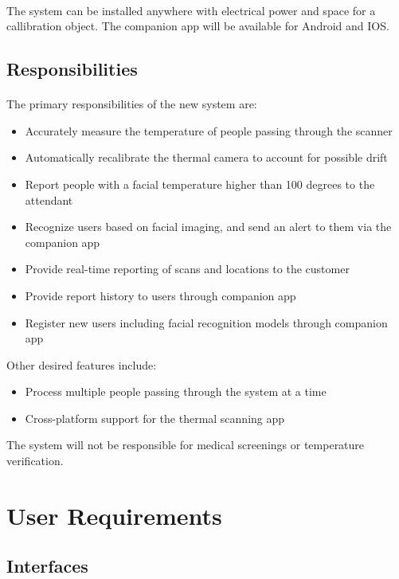 \documentclass[12pt, letterpaper]{article}
\begin{document}
    \paragraph{}
    The system can be installed anywhere with electrical power and space for a callibration object. The companion app
    will be available for Android and IOS.
    \subsection{Responsibilities}
    \paragraph{}
    The primary responsibilities of the new system are:
    \begin{itemize}
        \item Accurately measure the temperature of people passing through the scanner
        \item Automatically recalibrate the thermal camera to account for possible drift
        \item Report people with a facial temperature higher than 100 degrees to the attendant
        \item Recognize users based on facial imaging, and send an alert to them via the companion app
        \item Provide real-time reporting of scans and locations to the customer
        \item Provide report history to users through companion app
        \item Register new users including facial recognition models through companion app 
    \end{itemize}
    Other desired features include:
    \begin{itemize}
        \item Process multiple people passing through the system at a time
        \item Cross-platform support for the thermal scanning app
    \end{itemize}
    The system will not be responsible for medical screenings or temperature verification.
    \section{User Requirements}
    \subsection{Interfaces}
\end{document}
